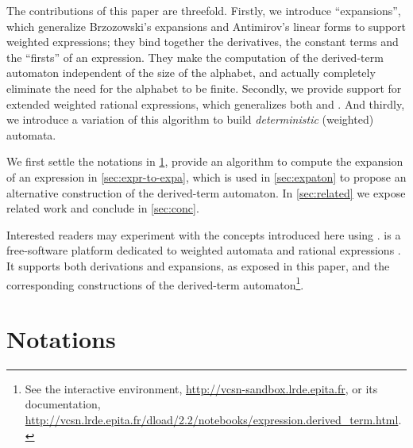 \documentclass[a4paper,USenglish]{lipics}
\begin{document}
\smallskip

The contributions of this paper are threefold.  Firstly, we introduce
``expansions'', which generalize Brzozowski's expansions and Antimirov's
linear forms to support weighted expressions; they bind together the
derivatives, the constant terms and the ``firsts'' of an expression.  They
make the computation of the derived-term automaton independent of the size
of the alphabet, and actually completely eliminate the need for the alphabet
to be finite.  Secondly, we provide support for extended weighted rational
expressions, which generalizes both \citet{lombardy.2005.tcs} and
\citet{caron.2011.lata.2}. And thirdly, we introduce a variation of this
algorithm to build \emph{deterministic} (weighted) automata.

We first settle the notations in \cref{sec:notations}, provide an algorithm
to compute the expansion of an expression in \cref{sec:expr-to-expa}, which
is used in \cref{sec:expaton} to propose an alternative construction of the
derived-term automaton.  In \cref{sec:related} we expose related work and
conclude in \cref{sec:conc}.

\smallskip

Interested readers may experiment with the concepts introduced here using
\vcsn.  \vcsn is a free-software platform dedicated to weighted automata and
rational expressions \citep{demaille.13.ciaa}.  It supports both derivations
and expansions, as exposed in this paper, and the corresponding
constructions of the derived-term automaton\footnote{\label{foot:url}See the
  interactive
  environment, \url{http://vcsn-sandbox.lrde.epita.fr}, or its documentation,\\
  \url{http://vcsn.lrde.epita.fr/dload/2.2/notebooks/expression.derived_term.html}.}.



\section{Notations}
\label{sec:notations}

\newcommand{\OB}[2]{\overbrace{#2}^{\text{#1}}}
\newcommand{\POB}[2]{\OB{\makebox[0pt]{#1}}{\vphantom{\bra{2}}#2}}
\newcommand{\UB}[2]{\underbrace{#2}_{\text{#1}}}
\newcommand{\PUB}[2]{\UB{\makebox[0pt]{#1}}{\vphantom{\bra{2}}#2}}
\end{document}
